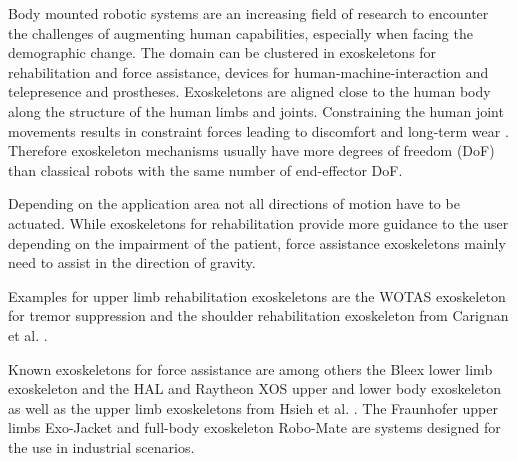 \documentclass[twocolumn,10pt]{IFTOMM}
\begin{document}
Body mounted robotic systems are an increasing field of research to encounter the challenges of augmenting human capabilities, especially when facing the demographic change.
The domain can be clustered in exoskeletons for rehabilitation and force assistance, devices for human-machine-interaction and telepresence and prostheses.
Exoskeletons are aligned close to the human body along the structure of the human limbs and joints.
Constraining the human joint movements results in constraint forces leading to discomfort and long-term wear \cite{Pons2008}.
%
Therefore exoskeleton mechanisms usually have more degrees of freedom (DoF) than classical robots with the same number of end-effector DoF.


Depending on the application area not all directions of motion have to be actuated.
While exoskeletons for rehabilitation provide more guidance to the user depending on the impairment of the patient, force assistance exoskeletons mainly need to assist in the direction of gravity.
%
%

Examples for upper limb rehabilitation exoskeletons are the WOTAS exoskeleton for tremor suppression \cite{RoconBelRuiMan2007} and the shoulder rehabilitation exoskeleton from Carignan et al. \cite{CarignanLis2005}.

Known exoskeletons for force assistance are among others the Bleex lower limb exoskeleton \cite{ChuKazZos2005} and the HAL \cite{Sankai2010} and Raytheon XOS upper and lower body exoskeleton as well as the upper limb exoskeletons from Hsieh et al. \cite{HsiehChiLan2015}. 
The Fraunhofer upper limbs Exo-Jacket \cite{Ebrahimi2017} and full-body exoskeleton Robo-Mate \cite{StadlerAltSchSch2017} are systems designed for the use in industrial scenarios.
\end{document}
